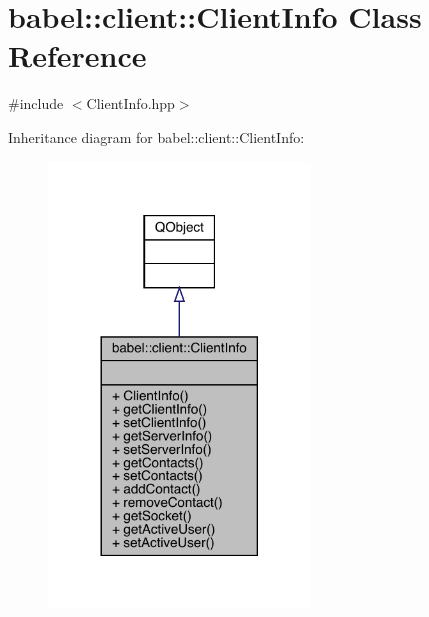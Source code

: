 \hypertarget{classbabel_1_1client_1_1_client_info}{}\section{babel\+:\+:client\+:\+:Client\+Info Class Reference}
\label{classbabel_1_1client_1_1_client_info}


{\ttfamily \#include $<$Client\+Info.\+hpp$>$}



Inheritance diagram for babel\+:\+:client\+:\+:Client\+Info\+:\nopagebreak
\begin{figure}[H]
\begin{center}
\leavevmode
\includegraphics[width=197pt]{classbabel_1_1client_1_1_client_info__inherit__graph}
\end{center}
\end{figure}


